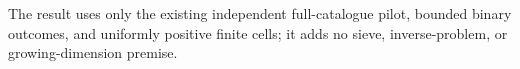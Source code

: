 The result uses only the existing independent full-catalogue pilot, bounded binary outcomes, and uniformly positive finite cells; it adds no sieve, inverse-problem, or growing-dimension premise.